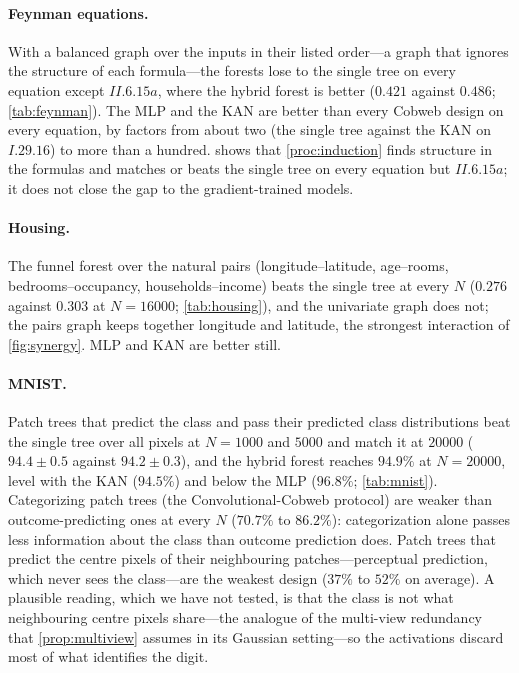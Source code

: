 \documentclass[11pt]{article}
\theoremstyle{definition}
\theoremstyle{remark}
\begin{document}
\paragraph{Feynman equations.}
With a balanced graph over the inputs in their listed order---a graph that ignores the
structure of each formula---the forests lose to the single tree on every equation except
$II.6.15a$, where the hybrid forest is better ($0.421$ against $0.486$; \cref{tab:feynman}).
The MLP and the KAN are better than every Cobweb design on every equation, by factors from
about two (the single tree against the KAN on $I.29.16$) to more than a hundred.
 shows that \cref{proc:induction} finds structure in the formulas and
matches or beats the single tree on every equation but $II.6.15a$; it does not close the
gap to the gradient-trained models.

\paragraph{Housing.}
The funnel forest over the natural pairs (longitude--latitude, age--rooms,
bedrooms--occupancy, households--income) beats the single tree at every $N$
($0.276$ against $0.303$ at $N=16000$; \cref{tab:housing}), and the univariate graph
does not; the pairs graph keeps together longitude and latitude, the strongest
interaction of \cref{fig:synergy}.  MLP and KAN are better still.

\paragraph{MNIST.}
Patch trees that predict the class and pass their predicted class distributions beat the
single tree over all pixels at $N=1000$ and $5000$ and match it at $20000$ ($94.4\pm0.5$
against $94.2\pm0.3$), and the hybrid forest reaches $94.9\%$ at
$N=20000$, level with the KAN ($94.5\%$) and below the MLP ($96.8\%$; \cref{tab:mnist}).
Categorizing patch trees (the Convolutional-Cobweb protocol) are weaker than
outcome-predicting ones at every $N$ ($70.7\%$ to $86.2\%$): categorization alone passes
less information about the class than outcome prediction does.  Patch trees that predict
the centre pixels of their neighbouring patches---perceptual prediction, which never sees
the class---are the weakest design ($37\%$ to $52\%$ on average).  A plausible reading, which we have
not tested, is that the class is not what neighbouring centre pixels share---the analogue
of the multi-view redundancy that \cref{prop:multiview} assumes in its Gaussian
setting---so the activations discard most of what identifies the digit.
\end{document}
